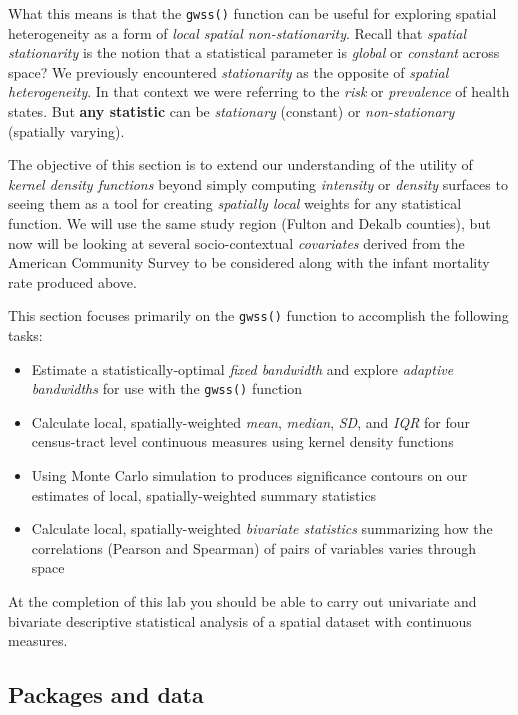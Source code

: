 \documentclass[
]{book}
\newcommand{\passthrough}[1]{#1}
\providecommand{\tightlist}{%
  \setlength{\itemsep}{0pt}\setlength{\parskip}{0pt}}
\begin{document}
What this means is that the \passthrough{\lstinline!gwss()!} function can be useful for exploring spatial heterogeneity as a form of \emph{local spatial non-stationarity}. Recall that \emph{spatial stationarity} is the notion that a statistical parameter is \emph{global} or \emph{constant} across space? We previously encountered \emph{stationarity} as the opposite of \emph{spatial heterogeneity}. In that context we were referring to the \emph{risk} or \emph{prevalence} of health states. But \textbf{any statistic} can be \emph{stationary} (constant) or \emph{non-stationary} (spatially varying).

The objective of this section is to extend our understanding of the utility of \emph{kernel density functions} beyond simply computing \emph{intensity} or \emph{density} surfaces to seeing them as a tool for creating \emph{spatially local} weights for any statistical function. We will use the same study region (Fulton and Dekalb counties), but now will be looking at several socio-contextual \emph{covariates} derived from the American Community Survey to be considered along with the infant mortality rate produced above.

This section focuses primarily on the \passthrough{\lstinline!gwss()!} function to accomplish the following tasks:

\begin{itemize}
\tightlist
\item
  Estimate a statistically-optimal \emph{fixed bandwidth} and explore \emph{adaptive bandwidths} for use with the \passthrough{\lstinline!gwss()!} function
\item
  Calculate local, spatially-weighted \emph{mean}, \emph{median}, \emph{SD}, and \emph{IQR} for four census-tract level continuous measures using kernel density functions
\item
  Using Monte Carlo simulation to produces significance contours on our estimates of local, spatially-weighted summary statistics
\item
  Calculate local, spatially-weighted \emph{bivariate statistics} summarizing how the correlations (Pearson and Spearman) of pairs of variables varies through space
\end{itemize}

At the completion of this lab you should be able to carry out univariate and bivariate descriptive statistical analysis of a spatial dataset with continuous measures.

\hypertarget{packages-and-data}{%
\subsection{Packages and data}\label{packages-and-data}}
\end{document}

